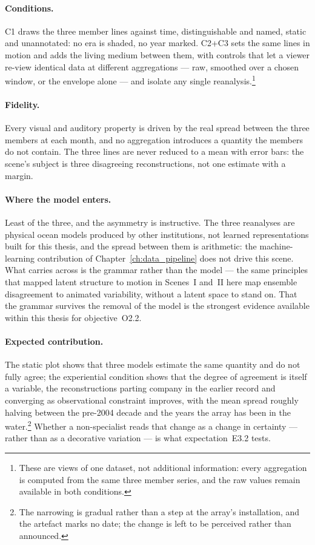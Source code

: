 \paragraph{Conditions.} C1 draws the three member lines against time, distinguishable and named, static and unannotated: no era is shaded, no year marked. C2+C3 sets the same lines in motion and adds the living medium between them, with controls that let a viewer re-view identical data at different aggregations --- raw, smoothed over a chosen window, or the envelope alone --- and isolate any single reanalysis.\footnote{These are views of one dataset, not additional information: every aggregation is computed from the same three member series, and the raw values remain available in both conditions.}

\paragraph{Fidelity.} Every visual and auditory property is driven by the real spread between the three members at each month, and no aggregation introduces a quantity the members do not contain. The three lines are never reduced to a mean with error bars: the scene's subject is three disagreeing reconstructions, not one estimate with a margin.

\paragraph{Where the model enters.} Least of the three, and the asymmetry is instructive. The three reanalyses are physical ocean models produced by other institutions, not learned representations built for this thesis, and the spread between them is arithmetic: the machine-learning contribution of Chapter~\ref{ch:data_pipeline} does not drive this scene. What carries across is the grammar rather than the model --- the same principles that mapped latent structure to motion in Scenes~I and~II here map ensemble disagreement to animated variability, without a latent space to stand on. That the grammar survives the removal of the model is the strongest evidence available within this thesis for objective~O2.2.

\paragraph{Expected contribution.} The static plot shows that three models estimate the same quantity and do not fully agree; the experiential condition shows that the degree of agreement is itself a variable, the reconstructions parting company in the earlier record and converging as observational constraint improves, with the mean spread roughly halving between the pre-2004 decade and the years the array has been in the water.\footnote{The narrowing is gradual rather than a step at the array's installation, and the artefact marks no date; the change is left to be perceived rather than announced.} Whether a non-specialist reads that change as a change in certainty --- rather than as a decorative variation --- is what expectation~E3.2 tests.

